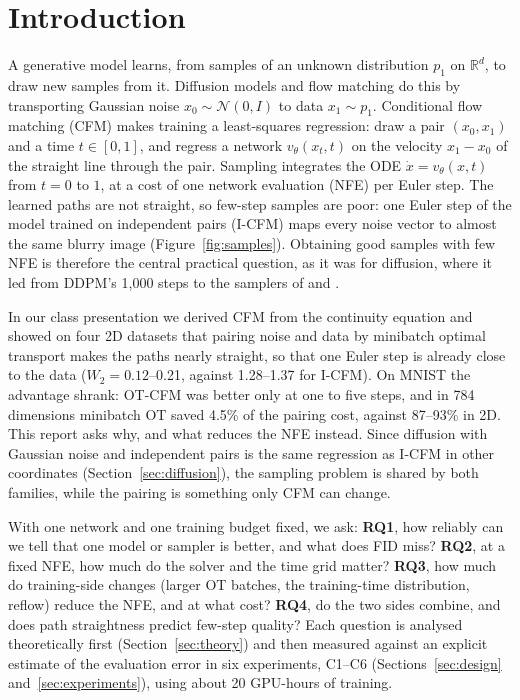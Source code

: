 \section{Introduction}\label{sec:intro}
A generative model learns, from samples of an unknown distribution $p_1$ on $\mathbb R^d$, to draw new samples from it. Diffusion models \citep{ho2020ddpm,song2021sde} and flow matching \citep{lipman2023fm,liu2023rf,albergo2023si} do this by transporting Gaussian noise $x_0\sim\mathcal N(0,I)$ to data $x_1\sim p_1$. Conditional flow matching (CFM) makes training a least-squares regression: draw a pair $(x_0,x_1)$ and a time $t\in[0,1]$, and regress a network $v_\theta(x_t,t)$ on the velocity $x_1-x_0$ of the straight line through the pair. Sampling integrates the ODE $\dot x=v_\theta(x,t)$ from $t=0$ to $1$, at a cost of one network evaluation (NFE) per Euler step. The learned paths are not straight, so few-step samples are poor: one Euler step of the model trained on independent pairs (I-CFM) maps every noise vector to almost the same blurry image (Figure~\ref{fig:samples}). Obtaining good samples with few NFE is therefore the central practical question, as it was for diffusion, where it led from DDPM's 1,000 steps to the samplers of \citet{song2021ddim} and \citet{karras2022edm}.

In our class presentation we derived CFM from the continuity equation and showed on four 2D datasets that pairing noise and data by minibatch optimal transport \citep[OT-CFM;][]{tong2024otcfm} makes the paths nearly straight, so that one Euler step is already close to the data ($W_2=0.12$--0.21, against 1.28--1.37 for I-CFM). On MNIST the advantage shrank: OT-CFM was better only at one to five steps, and in 784 dimensions minibatch OT saved 4.5\% of the pairing cost, against 87--93\% in 2D. This report asks why, and what reduces the NFE instead. Since diffusion with Gaussian noise and independent pairs is the same regression as I-CFM in other coordinates (Section~\ref{sec:diffusion}), the sampling problem is shared by both families, while the pairing is something only CFM can change.

With one network and one training budget fixed, we ask: \textbf{RQ1}, how reliably can we tell that one model or sampler is better, and what does FID miss? \textbf{RQ2}, at a fixed NFE, how much do the solver and the time grid matter? \textbf{RQ3}, how much do training-side changes (larger OT batches, the training-time distribution, reflow) reduce the NFE, and at what cost? \textbf{RQ4}, do the two sides combine, and does path straightness predict few-step quality? Each question is analysed theoretically first (Section~\ref{sec:theory}) and then measured against an explicit estimate of the evaluation error in six experiments, C1--C6 (Sections~\ref{sec:design} and~\ref{sec:experiments}), using about 20 GPU-hours of training.

